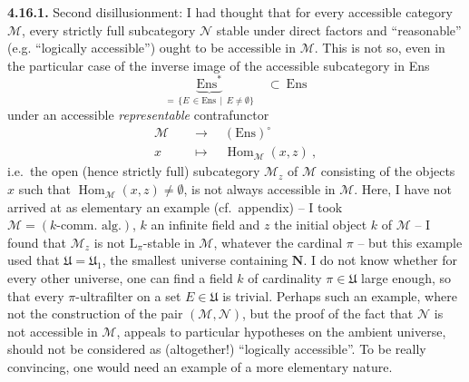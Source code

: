 \documentclass[11pt]{article}
\newcommand{\msp}[1]{\marginpar{\footnotesize [#1]}}
\newcommand{\Hom}{\operatorname{Hom}}
\newcommand{\Ens}{\mathrm{Ens}}
\begin{document}
\textbf{4.16.1.} Second disillusionment: I had thought that for every accessible category $\mathcal{M}$, every %
strictly full subcategory $\mathcal{N}$ stable under direct factors and ``reasonable'' (e.g. ``logically accessible'') ought to be accessible in $\mathcal{M}$. This is not so, even in the particular case of the inverse image of the accessible subcategory in Ens
\msp{465}
\[
\underbrace{\Ens^*}_{=\,\{E\,\in\Ens\,\mid\, E\neq\emptyset\}} \quad\subset\ \Ens
\]
under an accessible \textit{representable} contrafunctor
\[
\begin{aligned}
\mathcal{M} \quad &\longrightarrow \quad (\Ens)^\circ \\
x \quad &\longmapsto \quad \Hom_{\mathcal{M}}(x,z)\ ,
\end{aligned}
\]
i.e.\ the open (hence strictly full) subcategory $\mathcal{M}_z$ of $\mathcal{M}$ consisting of the objects $x$ such that $\Hom_{\mathcal{M}}(x,z) \neq \emptyset$, is not always accessible in $\mathcal{M}$. Here, I have not arrived at %
as elementary an example (cf.\ appendix) -- I took $\mathcal{M} = (k\text{-comm.\ alg.})$, $k$ an infinite field and $z$ the initial object $k$ of $\mathcal{M}$ -- I found that $\mathcal{M}_z$ is not $\mathrm{L}_\pi$-stable in $\mathcal{M}$, whatever the cardinal $\pi$ %
-- but this example used that $\mathfrak{U} = \mathfrak{U}_1$, the smallest universe containing $\mathbf{N}$. I do not know whether for every other universe, one can find a field $k$ of cardinality $\pi \in \mathfrak{U}$ large enough, so that every $\pi$-ultrafilter on a set $E \in \mathfrak{U}$ is trivial. Perhaps
\msp{466}
such an example, where not the construction of the pair $(\mathcal{M},\mathcal{N})$, but the proof of the fact that $\mathcal{N}$ is not accessible in $\mathcal{M}$, appeals to particular hypotheses on the ambient universe, should not be considered as (altogether!) ``logically accessible''. To be really convincing, one would need an example of a more elementary nature.
\end{document}
